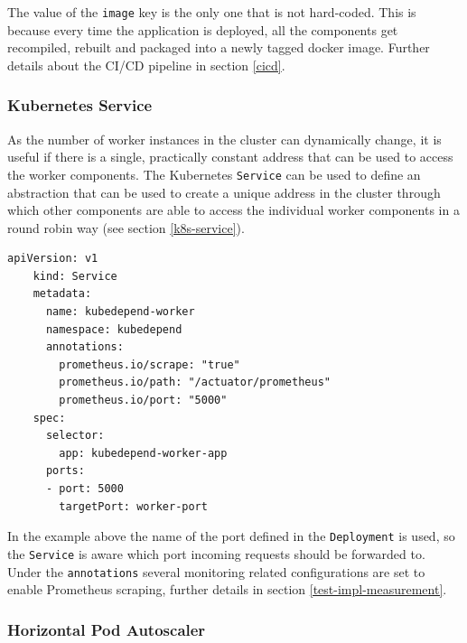 The value of the \texttt{image} key is the only one that is not hard-coded. This is because every time the application is deployed, all the components get recompiled, rebuilt and packaged into a newly tagged docker image. Further details about the CI/CD pipeline in section \ref{cicd}.

\subsubsection{Kubernetes Service}

As the number of worker instances in the cluster can dynamically change, it is useful if there is a single, practically constant address that can be used to access the worker components. The Kubernetes \texttt{Service} can be used to define an abstraction that can be used to create a unique address in the cluster through which other components are able to access the individual worker components in a round robin way (see section \ref{k8s-service}).

\vspace{0.5cm}
\begin{minipage}{\linewidth}
	\begin{lstlisting}[caption={Worker \texttt{Service}}]
	apiVersion: v1
	kind: Service
	metadata:
	  name: kubedepend-worker
	  namespace: kubedepend
	  annotations:
	    prometheus.io/scrape: "true"
	    prometheus.io/path: "/actuator/prometheus"
	    prometheus.io/port: "5000"
	spec:
	  selector:
	    app: kubedepend-worker-app
	  ports:
	  - port: 5000
	    targetPort: worker-port
	\end{lstlisting}
\end{minipage}

In the example above the name of the port defined in the \texttt{Deployment} is used, so the \texttt{Service} is aware which port incoming requests should be forwarded to. Under the \texttt{annotations} several monitoring related configurations are set to enable Prometheus scraping, further details in section \ref{test-impl-measurement}.


\subsubsection{Horizontal Pod Autoscaler}

